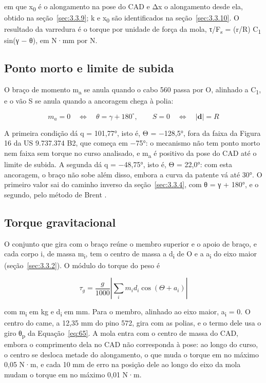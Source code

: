 em que x\textsubscript{0} é o alongamento na pose do CAD e Δx o alongamento desde ela, obtido na seção~\ref{sec:3.3.9}; k e x\textsubscript{0} são identificados na seção~\ref{sec:3.3.10}. O resultado da varredura é o torque por unidade de força da mola, τ/F\textsubscript{s} = (r/R) C\textsubscript{1} sin(γ − θ), em N·mm por N.

\subsection{Ponto morto e limite de subida}\label{sec:3.3.7}

O braço de momento m\textsubscript{a} se anula quando o cabo 560 passa por O, alinhado a C\textsubscript{1}, e o vão S se anula quando a ancoragem chega à polia:

\begin{equation}
  m_{a} = 0\quad \Leftrightarrow \quad\theta = \gamma + 180^{\circ},\quad\quad S = 0\quad \Leftrightarrow \quad\left| \mathbf{d} \right| = R
  \label{eq:63}
\end{equation}

A primeira condição dá q = 101,77°, isto é, Θ = −128,5°, fora da faixa da Figura 16 da US 9.737.374 B2, que começa em −75°: o mecanismo não tem ponto morto nem faixa sem torque no curso analisado, e m\textsubscript{a} é positivo da pose do CAD até o limite de subida. A segunda dá q = −48,75°, isto é, Θ = 22,0°: com esta ancoragem, o braço não sobe além disso, embora a curva da patente vá até 30°. O primeiro valor sai do caminho inverso da seção~\ref{sec:3.3.4}, com θ = γ + 180°, e o segundo, pelo método de Brent \cite{brent1973}.

\subsection{Torque gravitacional}\label{sec:3.3.8}

O conjunto que gira com o braço reúne o membro superior e o apoio de braço, e cada corpo i, de massa m\textsubscript{i}, tem o centro de massa a d\textsubscript{i} de O e a a\textsubscript{i} do eixo maior (seção~\ref{sec:3.3.2}). O módulo do torque do peso é

\begin{equation}
  \tau_{g} = \frac{g}{1000}\left| \sum_{i}^{}m_{i}d_{i}\cos{(\Theta + a_{i})} \right|
  \label{eq:64}
\end{equation}

com m\textsubscript{i} em kg e d\textsubscript{i} em mm. Para o membro, alinhado ao eixo maior, a\textsubscript{i} = 0. O centro do came, a 12,35 mm do pino 572, gira com as polias, e o termo dele usa o giro θ\textsubscript{p} da Equação~\eqref{eq:65}. A mola entra com o centro de massa do CAD, embora o comprimento dela no CAD não corresponda à pose: ao longo do curso, o centro se desloca metade do alongamento, o que muda o torque em no máximo 0,05 N·m, e cada 10 mm de erro na posição dele ao longo do eixo da mola mudam o torque em no máximo 0,01 N·m.

